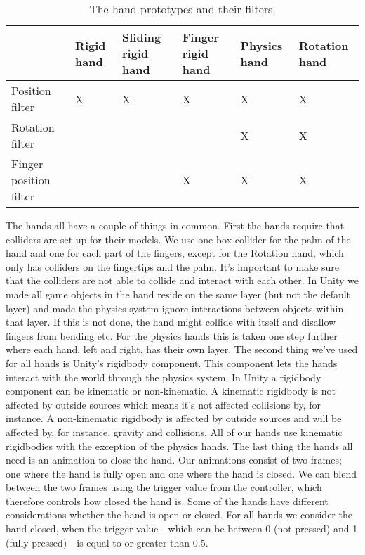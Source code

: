 \begin{table}[H]
\centering
\caption{The hand prototypes and their filters.}
\label{tab:handPrototypes}
\begin{tabular}{C{2.8cm}|C{2cm}C{2cm}C{2cm}C{2cm}C{2cm}}
 & Rigid hand & Sliding rigid hand & Finger rigid hand & Physics hand & Rotation hand \\ \midrule
Position filter & \Large X & \Large X & \Large X & \Large X & \Large X\\ \midrule
Rotation filter & & & & \Large X & \Large X \\ \midrule
Finger position filter & & & \Large X & \Large X & \Large X 
\end{tabular}
\end{table}

The hands all have a couple of things in common. First the hands require that colliders are set up for their models. We use one box collider for the palm of the hand and one for each part of the fingers, except for the Rotation hand, which only has colliders on the fingertips and the palm. It's important to make sure that the colliders are not able to collide and interact with each other. In Unity we made all game objects in the hand reside on the same layer (but not the default layer) and made the physics system ignore interactions between objects within that layer. If this is not done, the hand might collide with itself and disallow fingers from bending etc. For the physics hands this is taken one step further where each hand, left and right, has their own layer. The second thing we've used for all hands is Unity's rigidbody component. This component lets the hands interact with the world through the physics system. In Unity a rigidbody component can be kinematic or non-kinematic. A kinematic rigidbody is not affected by outside sources which means it's not affected collisions by, for instance. A non-kinematic rigidbody is affected by outside sources and will be affected by, for instance, gravity and collisions. All of our hands use kinematic rigidbodies with the exception of the physics hands. The last thing the hands all need is an animation to close the hand. Our animations consist of two frames; one where the hand is fully open and one where the hand is closed. We can blend between the two frames using the trigger value from the controller, which therefore controls how closed the hand is. Some of the hands have different considerations whether the hand is open or closed. For all hands we consider the hand closed, when the trigger value - which can be between 0 (not pressed) and 1 (fully pressed) - is equal to or greater than 0.5.

